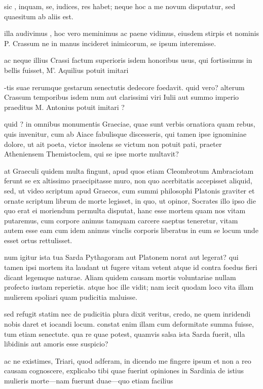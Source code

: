  sic , inquam, se, iudices, res habet; neque hoc a me novum disputatur, sed quaesitum ab aliis est.

 illa audivimus , hoc vero meminimus ac paene vidimus, eiusdem stirpis et nominis P. Crassum ne in manus incideret inimicorum, se ipsum interemisse.

 ac neque illius Crassi factum superioris isdem honoribus usus, qui fortissimus in bellis fuisset, M'. Aquilius potuit imitari

 -tis suae rerumque gestarum senectutis dedecore foedavit. quid vero? alterum Crassum temporibus isdem num aut clarissimi viri Iulii aut summo imperio praeditus M. Antonius potuit imitari ?

 quid ? in omnibus monumentis Graeciae, quae sunt verbis ornatiora quam rebus, quis invenitur, cum ab Aiace fabulisque discesseris, qui tamen ipse ignominiae dolore, ut ait poeta, victor insolens se victum non potuit pati, praeter Atheniensem Themistoclem, qui se ipse morte multavit?

 at Graeculi quidem multa fingunt, apud quos etiam Cleombrotum Ambraciotam ferunt se ex altissimo praecipitasse muro, non quo acerbitatis accepisset aliquid, sed, ut video scriptum apud Graecos, cum summi philosophi Platonis graviter et ornate scriptum librum de morte legisset, in quo, ut opinor, Socrates illo ipso die quo erat ei moriendum permulta disputat, hanc esse mortem quam nos vitam putaremus, cum corpore animus tamquam carcere saeptus teneretur, vitam autem esse eam cum idem animus vinclis corporis liberatus in eum se locum unde esset ortus rettulisset.

 num igitur ista tua Sarda Pythagoram aut Platonem norat aut legerat? qui tamen ipsi mortem ita laudant ut fugere vitam vetent atque id contra foedus fieri dicant legemque naturae. Aliam quidem causam mortis voluntariae nullam profecto iustam reperietis. atque hoc ille vidit; nam iecit quodam loco vita illam mulierem spoliari quam pudicitia maluisse.

 sed refugit statim nec de pudicitia plura dixit veritus, credo, ne quem inridendi nobis daret et iocandi locum. constat enim illam cum deformitate summa fuisse, tum etiam senectute. qua re quae potest, quamvis salsa ista Sarda fuerit, ulla libidinis aut amoris esse suspicio?

 ac ne existimes, Triari, quod adferam, in dicendo me fingere ipsum et non a reo causam cognoscere, explicabo tibi quae fuerint opiniones in Sardinia de istius mulieris morte—nam fuerunt duae—quo etiam facilius

